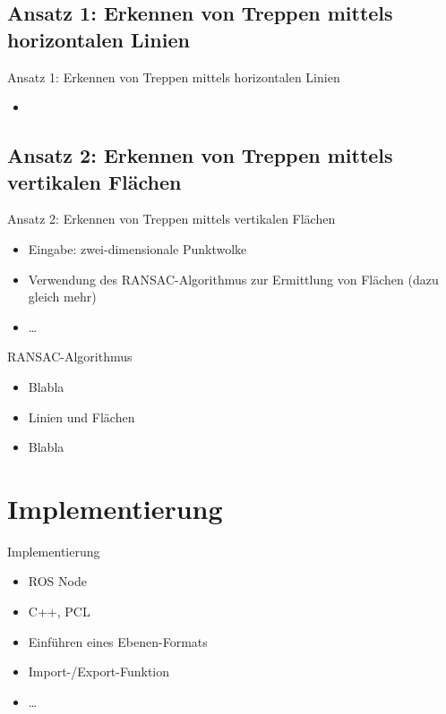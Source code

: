 \documentclass[18pt]{beamer}
\begin{document}
\subsection{Ansatz 1: Erkennen von Treppen mittels horizontalen Linien}
\begin{frame}{Ansatz 1: Erkennen von Treppen mittels horizontalen Linien}
\begin{itemize}
	\item
\end{itemize}
\end{frame}


\subsection{Ansatz 2: Erkennen von Treppen mittels vertikalen Flächen}
\begin{frame}{Ansatz 2: Erkennen von Treppen mittels vertikalen Flächen}
\begin{itemize}
	\item Eingabe: zwei-dimensionale Punktwolke
	\item Verwendung des RANSAC-Algorithmus zur Ermittlung von Flächen (dazu gleich mehr)
	\item \dots
\end{itemize}
\end{frame}

\begin{frame}{RANSAC-Algorithmus}
\begin{itemize}
	\item Blabla
	\item Linien und Flächen
	\item Blabla
\end{itemize}
\end{frame}



\section{Implementierung}

\begin{frame}{Implementierung}
\begin{itemize}
	\item ROS Node
	\item C++, PCL
	\item Einführen eines Ebenen-Formats
	\item Import-/Export-Funktion
	\item \dots
\end{itemize}
\end{frame}
\end{document}
